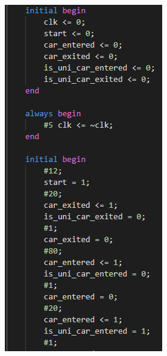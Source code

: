 \documentclass{article}
\begin{document}
\begin{enumerate}[label=\textbf{\alph*)}]
\begin{figure}[H]
    \centering
    \begin{minipage}{0.45\textwidth}
        \centering
        \includegraphics[width=\textwidth]{Test1.png}

\end{minipage}
\end{figure}
\end{enumerate}
\end{document}
